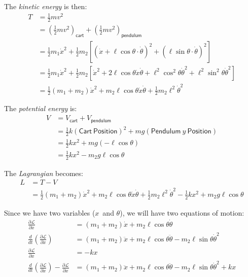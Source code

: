 \documentclass[letterpaper,8pt]{article}
\begin{document}
The \emph{kinetic energy} is then:
\begin{align*}
T &= \frac{1}{2} mv^2 \\
  &= \left(\frac{1}{2} mv^2\right)_{\mathsf{cart}} + \left(\frac{1}{2} mv^2\right)_{\mathsf{pendulum}} \\
  &= \frac{1}{2} m_1 \dot{x}^2 
   + \frac{1}{2} m_2 \left[ \left( \dot{x} + \ell\cos\theta\cdot\dot{\theta} \right)^2 + \left(\ell\sin\theta\cdot\dot{\theta}\right)^2\right] \\
  &= \frac{1}{2} m_1 \dot{x}^2
   + \frac{1}{2} m_2 \left[ \dot{x}^2 + 2\ell\cos\theta\dot{x}\dot{\theta} + \ell^2\cos^2\theta\dot{\theta}^2 + \ell^2\sin^2\theta\dot{\theta}^2 \right] \\
  &= \frac{1}{2} (m_1 + m_2) \dot{x}^2 + m_2\ell\cos\theta\dot{x}\dot{\theta} + \frac{1}{2}m_2\ell^2\dot{\theta}^2 
\end{align*}

The \emph{potential energy} is:
\begin{align*}
V &= V_{\mathsf{cart}} + V_{\mathsf{pendulum}} \\
  &= \frac{1}{2}k(\mathsf{Cart\ Position})^2 + mg (\mathsf{Pendulum}\ y\ \mathsf{Position}) \\
  &= \frac{1}{2}kx^2 + mg (-\ell \cos \theta) \\
  &= \frac{1}{2}kx^2 - m_2 g \ell \cos \theta
\end{align*}

The \emph{Lagrangian} becomes:
\begin{align*}
L &= T - V \\
  &= \frac{1}{2} (m_1 + m_2) \dot{x}^2 + m_2\ell\cos\theta\dot{x}\dot{\theta} + \frac{1}{2}m_2\ell^2\dot{\theta}^2 
       - \frac{1}{2}kx^2 + m_2 g \ell \cos \theta
\end{align*}

Since we have two variables ($x$\ and $\theta$), we will have two equations of motion:
\begin{align*}
\frac{\partial \mathcal{L}}{\partial \dot{x}} &= (m_1 + m_2)\dot{x} + m_2\ell\cos\theta\dot{\theta} \\
\frac{d}{dt} \left( \frac{\partial \mathcal{L}}{\partial \dot{x}} \right) &= (m_1 + m_2)\ddot{x} 
         + m_2\ell\cos\theta\ddot{\theta} - m_2\ell\sin\theta\dot{\theta}^2 \\
\frac{\partial \mathcal{L}}{\partial x} &= - kx \\
\frac{d}{dt} \left( \frac{\partial \mathcal{L}}{\partial \dot{x}} \right) - \frac{\partial \mathcal{L}}{\partial x} &=
         (m_1 + m_2)\ddot{x} + m_2\ell\cos\theta\ddot{\theta} - m_2\ell\sin\theta\dot{\theta}^2 + kx 
\end{align*}
\end{document}
